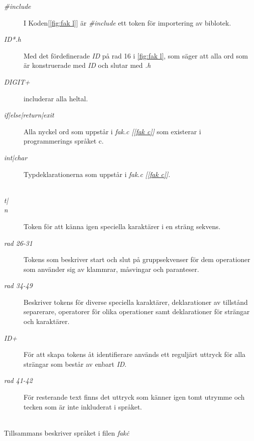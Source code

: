 \begin{description}

\item[\textit{\#include}] I Koden[\ref{fig:fak l}] är \textit{\#include} ett token för importering av biblotek. 

\item[\textit{{ID}*.h}] Med det fördefinerade \textit{ID} på rad 16 i
\ref{fig:fak l}, som säger att alla ord som är konstruerade med \textit{ID} och slutar
med \textit{.h}

\item[\textit{{DIGIT}+}] includerar alla heltal.

\item[\textit{if|else|return|exit}] Alla nyckel ord som uppstår i \textit{fak.c [\ref{fak c}] }
som existerar i programmerings språket c.

\item[\textit{int|char}] Typdeklarationerna som uppstår i \textit{fak.c [\ref{fak c}]}. 

\item[\textit{\\t|\\n}] Token för att känna igen speciella karaktärer i en sträng sekvens.

\item[\textit{rad 26-31}] Tokens som beskriver start och slut på gruppsekvenser för dem
operationer som använder sig av klammrar, måsvingar och paranteser.

\item[\textit{rad 34-49}] Beskriver tokens för diverse speciella karaktärer, deklarationer av
tillstånd separerare, operatorer för olika operationer samt deklarationer för strängar och
karaktärer.

\item[\textit{{ID}+}] För att skapa tokens åt identifierare används ett reguljärt uttryck för alla strängar som
består av enbart \textit{ID}.

\item[\textit{rad 41-42}] För resterande text finns det uttryck som känner igen tomt utrymme och
tecken som är inte inkluderat i språket.

\end{description}

\\ Tillsammans beskriver språket i filen \textit{fak\.c}
